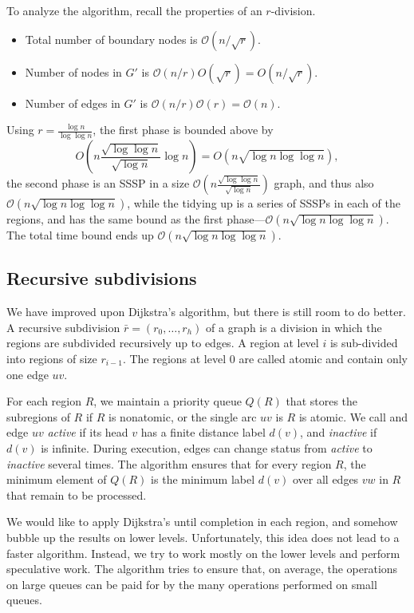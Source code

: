 \documentclass[11pt]{article}
\begin{document}
To analyze the algorithm, recall the properties of an $r$-division.
\begin{itemize}
\item Total number of boundary nodes is $\mathcal{O}(n/\sqrt{r})$.
\item Number of nodes in $G'$ is $\mathcal{O}(n/r)O(\sqrt{r})=O(n/\sqrt{r})$.
\item Number of edges in $G'$ is $\mathcal{O}(n/r)\mathcal{O}(r) = \mathcal{O}(n)$.
\end{itemize}

Using $r=\frac{\log n}{\log \log n}$, the first phase is bounded above by
\[
  O\left(n\frac{\sqrt{\log \log n}}{\sqrt{\log n}} \log n\right)= O(n \sqrt{\log n \log \log n}),
\]
the second phase is an SSSP in a size $\mathcal{O}(n \frac{\sqrt{\log \log n}}{\sqrt{\log n}})$ graph, and thus also $\mathcal{O}(n \sqrt{\log n \log \log n})$, while the tidying up is a series of SSSPs in each of the regions, and has the same bound as the first phase---$\mathcal{O}(n \sqrt{\log n \log \log n})$. The total time bound ends up $\mathcal{O}(n \sqrt{\log n \log \log n})$.

\subsection{Recursive subdivisions}
\label{sec:recursion}

We have improved upon Dijkstra's algorithm, but there is still room to do better. A recursive subdivision $\bar{r} = (r_0, \ldots, r_h)$ of a graph is a division in which the regions are subdivided recursively up to edges. A region at level $i$ is sub-divided into regions of size $r_{i-1}$. The regions at level $0$ are called atomic and contain only one edge $uv$.

For each region $R$, we maintain a priority queue $Q(R)$ that stores the subregions of $R$ if $R$ is nonatomic, or the single arc $uv$ is $R$ is atomic. We call and edge $uv$ \emph{active} if its head $v$ has a finite distance label $d(v)$, and \emph{inactive} if $d(v)$ is infinite. During execution, edges can change status from \emph{active} to \emph{inactive} several times. The algorithm ensures that for every region $R$, the minimum element of $Q(R)$ is the minimum label $d(v)$ over all edges $vw$ in $R$ that remain to be processed.

We would like to apply Dijkstra's until completion in each region, and somehow bubble up the results on lower levels. Unfortunately, this idea does not lead to a faster algorithm. Instead, we try to work mostly on the lower levels and perform speculative work. The algorithm tries to ensure that, on average, the operations on large queues can be paid for by the many operations performed on small queues.
\end{document}
